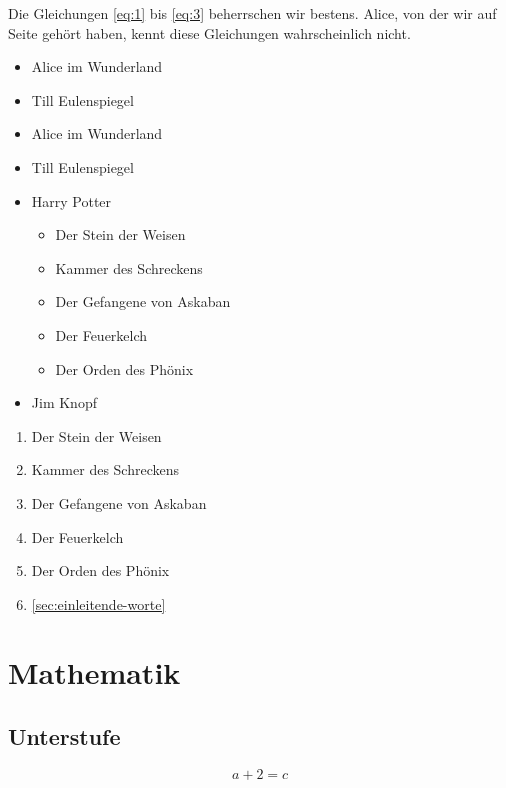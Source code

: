 Die Gleichungen \eqref{eq:1} bis \eqref{eq:3} beherrschen wir bestens.
Alice, von der wir auf Seite \pageref{sec:einleitende-worte} gehört
haben, kennt diese Gleichungen wahrscheinlich nicht.

\begin{itemize}
  \item Alice im Wunderland
  \item Till Eulenspiegel
\end{itemize}

\begin{itemize}
  \item Alice im Wunderland
  \item Till Eulenspiegel
  \item Harry Potter
        \begin{itemize}
          \item Der Stein der Weisen
          \item Kammer des Schreckens
          \item Der Gefangene von Askaban
          \item Der Feuerkelch
          \item Der Orden des Phönix
        \end{itemize}
  \item Jim Knopf
\end{itemize}

\begin{enumerate}
  \item Der Stein der Weisen
  \item Kammer des Schreckens
  \item Der Gefangene von Askaban
  \item Der Feuerkelch
  \item Der Orden des Phönix
  \item \ref{sec:einleitende-worte}
\end{enumerate}

\section{Mathematik}
\label{sec:mathematik}

\subsection{Unterstufe}
\label{sec:unterstufe}

\begin{equation*}
  a + 2 = c
\end{equation*}

